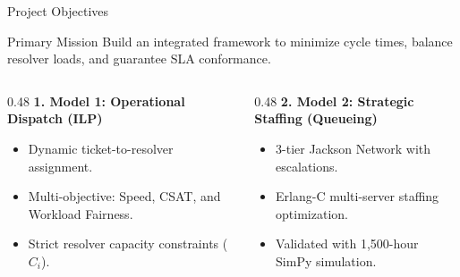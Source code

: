 \documentclass[10pt,aspectratio=169]{beamer}
\begin{document}
\begin{frame}{Project Objectives}
    \begin{block}{Primary Mission}
        \centering
        Build an integrated framework to minimize cycle times, balance resolver loads, and guarantee SLA conformance.
    \end{block}
    \vspace{0.4cm}
    \begin{columns}[T]
        \begin{column}{0.48\textwidth}
            \textbf{1. Model 1: Operational Dispatch (ILP)}
            \vspace{0.2cm}
            \begin{itemize}
                \setlength\itemsep{0.5em}
                \item Dynamic ticket-to-resolver assignment.
                \item Multi-objective: Speed, CSAT, and Workload Fairness.
                \item Strict resolver capacity constraints ($C_i$).
            \end{itemize}
        \end{column}
        \begin{column}{0.48\textwidth}
            \textbf{2. Model 2: Strategic Staffing (Queueing)}
            \vspace{0.2cm}
            \begin{itemize}
                \setlength\itemsep{0.5em}
                \item 3-tier Jackson Network with escalations.
                \item Erlang-C multi-server staffing optimization.
                \item Validated with 1,500-hour SimPy simulation.
            \end{itemize}
        \end{column}
    \end{columns}
\end{frame}
\end{document}
